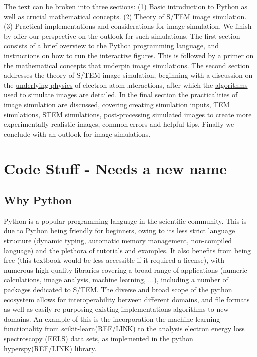 \documentclass[%
 superscriptaddress,
 aip,
 amsmath,amssymb,
preprint,%
 author-year,%
longbibliography
]{revtex4-2}
\begin{document}
The text can be broken into three sections: (1) Basic introduction to Python as well as crucial mathematical concepts. (2) Theory of S/TEM image simulation. (3) Practical implementations and considerations for image simulation. We finish by offer our perspective on the outlook for such simulations. The first section consists of a brief overview to the \href{code_stuff}{Python programming language}, and instructions on how to run the interactive figures. This is followed by a primer on the \href{math_stuff}{mathematical concepts} that underpin image simulations. The second section addresses the theory of S/TEM image simulation, beginning with a discussion on the \href{physics_stuff}{underlying physics} of electron-atom interactions, after which the \href{electron_scatter}{algorithms} used to simulate images are detailed. In the final section the practicalities of image simulation are discussed, covering \href{sim_inputs}{creating simulation inputs}, \href{TEM_SIMS}{TEM simulations}, \href{STEM_SIMS}{STEM simulations}, post-processing simulated images to create more experimentally realistic images, common errors and helpful tips. Finally we conclude with an outlook for image simulations.


\section*{Code Stuff - Needs a new name}\label{code_stuff}

\subsection*{Why Python}
Python is a popular programming language in the scientific community. This is due to Python being friendly for beginners, owing to its less strict language structure (dynamic typing, automatic memory management, non-compiled language) and the plethora of tutorials and examples. It also benefits from being free (this textbook would be less accessible if it required a license), with numerous high quality libraries covering a broad range of applications (numeric calculations, image analysis, machine learning, ...), including a number of packages dedicated to S/TEM. The diverse and broad scope of the python ecosystem allows for interoperability between different domains, and file formats as well as easily re-purposing existing implementations algorithms to new domains. An example of this is the incorporation the machine learning functionality from scikit-learn(REF/LINK) to the analysis electron energy loss spectroscopy (EELS) data sets, as implemented in the python hyperspy(REF/LINK) library.
\end{document}
